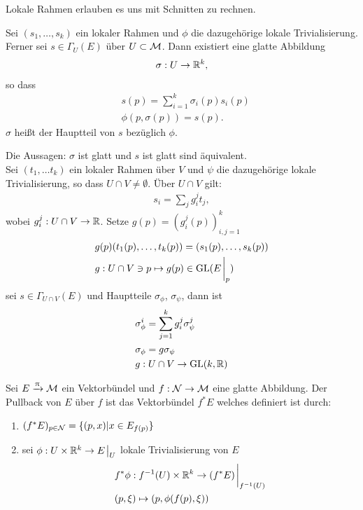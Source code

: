 Lokale Rahmen erlauben es uns mit Schnitten zu rechnen.

\begin{defs}[Hauptteil]
Sei $(s_1, \dots, s_k)$ ein lokaler Rahmen und $\phi$ die dazugehörige lokale Trivialisierung.
Ferner sei $s \in \Gamma_U (E)$ über $U \subset \mathcal{M}$.
Dann existiert eine glatte Abbildung
\begin{align}
\sigma : U \to \mathbb{R}^k,
\end{align}
so dass
\begin{align}
&s(p) = \sum^{k}_{i=1} \sigma_i (p) s_i(p)\\
&\phi(p, \sigma(p)) = s(p).
\end{align}
$\sigma$ heißt der Hauptteil von $s$ bezüglich $\phi$.
\end{defs}

\begin{bem}
Die Aussagen: $\sigma$ ist glatt und $s$ ist glatt sind äquivalent.\\
Sei $(t_1, \dots t_k)$ ein lokaler Rahmen über $V$ und $\psi$ die dazugehörige lokale Trivialisierung, so dass $U \cap V \neq \emptyset$.
Über $U \cap V$ gilt:
\begin{align}
s_i = \sum_j g^j_i t_j,
\end{align}
wobei $g^j_i : U \cap V \to \mathbb{R}$.
Setze $g(p) = (g^j_i (p))^k_{i,j =1}$
\begin{align}
&g(p)(t_1(p), \dots , t_k(p)) = (s_1(p), \dots, s_k(p))\\
&g: U \cap V \ni p \mapsto g(p) \in \mathrm{GL}(E\eval_p)
\end{align}
sei $s \in \Gamma_{U \cap V} (E)$ und Hauptteile $\sigma_\phi$, $\sigma_\psi$, dann ist
\begin{align}
&\sigma^i_\phi = \sum^k_{j=1} g^j_i \sigma^j_{\psi}\\
&\sigma_\phi = g \sigma_\psi\\
&g : U \cap V \to \mathrm{GL} (k, \mathbb{R})
\end{align}
\end{bem}


\begin{defs}[Pullback]
Sei $E	\xrightarrow{\uppi} \mathcal{M}$ ein Vektorbündel und $f : \mathcal{N} \to \mathcal{M}$ eine glatte Abbildung.
Der Pullback von $E$ über $f$ ist das Vektorbündel $f^* E$ welches definiert ist durch:
\begin{enumerate}
\item $(f^* E)_{p \in \mathcal{N}} = \{ (p, x) \vert x \in E_{f(p)}\}$
\item sei $\phi : U \times \R^k \to E\eval_U$ lokale Trivialisierung von $E$
\begin{align}
&f^* \phi : f^{-1} (U) \times \R^k \to (f^* E)\eval_{f^{-1}(U)}\\
&(p, \xi) \mapsto (p, \phi(f(p), \xi)) 
\end{align}
\end{enumerate}
\end{defs}


